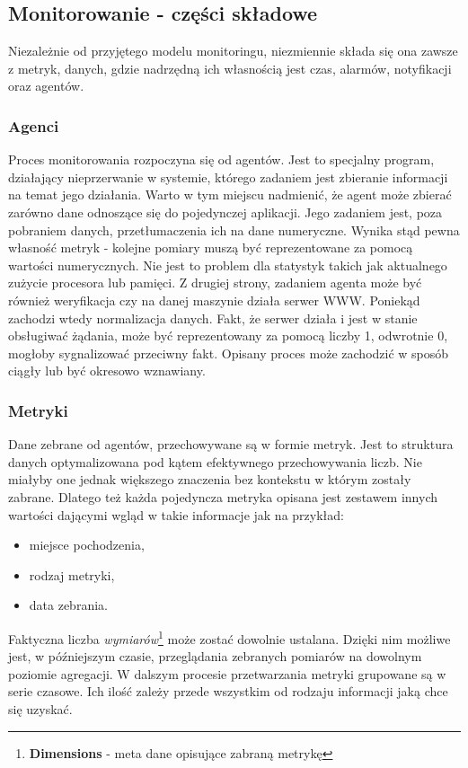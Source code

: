     \subsection{Monitorowanie - części składowe}
    Niezależnie od przyjętego modelu monitoringu, niezmiennie składa się ona zawsze z metryk, danych, gdzie nadrzędną 
    ich własnością jest czas, alarmów, notyfikacji oraz agentów.
    
        \subsubsection{Agenci}
        Proces monitorowania rozpoczyna się od agentów. Jest to specjalny program, działający nieprzerwanie w systemie, którego
        zadaniem jest zbieranie informacji na temat jego działania. Warto w tym miejscu nadmienić, że agent może zbierać zarówno
        dane odnoszące się do pojedynczej aplikacji. Jego zadaniem jest, poza pobraniem danych, przetłumaczenia ich na dane 
        numeryczne. Wynika stąd pewna własność metryk - kolejne pomiary muszą być reprezentowane za pomocą wartości numerycznych.
        Nie jest to problem dla statystyk takich jak aktualnego zużycie procesora lub pamięci. Z drugiej strony, zadaniem agenta
        może być również weryfikacja czy na danej maszynie działa serwer WWW. Poniekąd zachodzi wtedy normalizacja danych. Fakt, że
        serwer działa i jest w stanie obsługiwać żądania, może być reprezentowany za pomocą liczby 1, odwrotnie 0, mogłoby sygnalizować
        przeciwny fakt. Opisany proces może zachodzić w sposób ciągły lub być okresowo wznawiany.
        
        \subsubsection{Metryki}
        Dane zebrane od agentów, przechowywane są w formie metryk. Jest to struktura danych optymalizowana pod kątem
        efektywnego przechowywania liczb. Nie miałyby one jednak większego znaczenia bez kontekstu w którym zostały
        zabrane. Dlatego też każda pojedyncza metryka opisana jest zestawem innych wartości dającymi wgląd w takie
        informacje jak na przykład:
        \begin{itemize}
            \item miejsce pochodzenia,
            \item rodzaj metryki,
            \item data zebrania.
        \end{itemize}
        Faktyczna liczba \textit{wymiarów}\footnote{\textbf{Dimensions} - meta dane opisujące zabraną metrykę} może
        zostać dowolnie ustalana. Dzięki nim możliwe jest, w późniejszym czasie, przeglądania zebranych pomiarów
        na dowolnym poziomie agregacji. W dalszym procesie przetwarzania metryki grupowane są w serie czasowe. Ich ilość
        zależy przede wszystkim od rodzaju informacji jaką chce się uzyskać.
        
